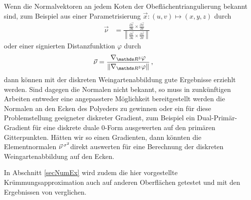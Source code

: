     \begin{fazit}
      Wenn die Normalvektoren an jedem Koten der Obeflächentriangulierung bekannt sind, zum Beispiel aus einer Parametrisierung
      \( \vec{x}: \left( u,v \right) \mapsto \left( x,y,z \right)\) durch
      \begin{align}
        \vec{\nu} &= \frac{\frac{\partial\vec{x}}{\partial u} \times \frac{\partial\vec{x}}{\partial v}}
                             {\left\| \frac{\partial\vec{x}}{\partial u} \times \frac{\partial\vec{x}}{\partial v} \right\|}
      \end{align}
      oder einer signierten Distanzfunktion \( \varphi \) durch
      \begin{align}
        \vec{\nu} &= \frac{\nabla_{\R^{3}}\varphi}{\left\| \nabla_{\R^{3}}\varphi \right\|} \formkomma
      \end{align}
      dann können mit der diskreten Weingartenabbildung gute Ergebnisse erziehlt werden.
      Sind dagegen die Normalen nicht bekannt, so muss in zunkünftigen Arbeiten entweder eine angepasstere Möglichkeit bereitgestellt
      werden die Normalen an den Ecken des Polyeders zu gewinnen oder ein für diese Problemstellung geeigneter diskreter Gradient,
      zum Beispiel ein Dual-Primär-Gradient für eine diskrete duale \( 0 \)-Form ausgewerten auf den primären Gitterpunkten.
      Hätten wir so einen Gradienten, dann könnten die Elementnormalen \( \vec{\nu}^{\,\sigma^{2}} \)direkt auswerten für eine
      Berechnung der diskreten Weingartenabbildung auf den Ecken.

      In Abschnitt \ref{secNumEx} wird zudem die hier vorgestellte Krümmungsapproximation auch auf anderen Oberflächen getestet und mit den
      Ergebnissen von \cite{heine} verglichen.
    \end{fazit}



